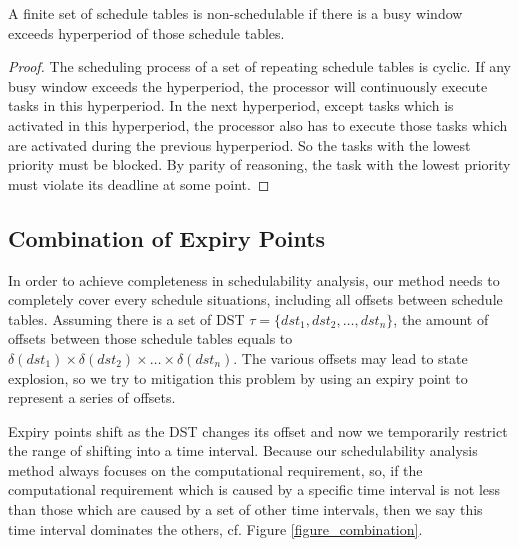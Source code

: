 \documentclass[sigconf]{acmart}
\begin{document}
\begin{lemma}
  A finite set of schedule tables is non-schedulable if there is a busy window exceeds hyperperiod of those schedule tables.
\end{lemma}\label{lemma_hyperperiod}
\begin{proof}
  The scheduling process of a set of repeating schedule tables is cyclic. If any busy window exceeds the hyperperiod, the processor will continuously execute tasks in this hyperperiod. In the next hyperperiod, except tasks which is activated in this hyperperiod, the processor also has to execute those tasks which are activated during the previous hyperperiod. So the tasks with the lowest priority must be blocked. By parity of reasoning, the task with the lowest priority must violate its deadline at some point.
\end{proof}
\subsection{Combination of Expiry Points}\label{section_combination}
In order to achieve completeness in schedulability analysis, our method needs to completely cover every schedule situations, including all offsets between schedule tables. Assuming there is a set of DST $\tau=\{dst_1,dst_2,\dots,dst_n\}$, the amount of offsets between those schedule tables equals to $\delta(dst_1)\times\delta(dst_2)\times\dots\times\delta(dst_n)$. The various offsets may lead to state explosion, so we try to mitigation this problem by using an expiry point to represent a series of offsets.

Expiry points shift as the DST changes its offset and now we temporarily restrict the range of shifting into a time interval. Because our schedulability analysis method always focuses on the computational requirement, so, if the computational requirement which is caused by a specific time interval is not less than those which are caused by a set of other time intervals, then we say this time interval dominates the others, cf. Figure \ref{figure_combination}.
\end{document}
